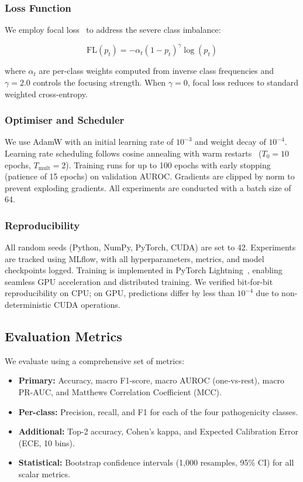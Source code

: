 \documentclass[journal,twoside]{IEEEtran}
\begin{document}
\subsubsection{Loss Function}
We employ focal loss~\cite{lin2017focal} to address the severe class
imbalance:

\begin{equation}
    \text{FL}(p_t) = -\alpha_t (1 - p_t)^\gamma \log(p_t)
\end{equation}

\noindent where $\alpha_t$ are per-class weights computed from inverse class
frequencies and $\gamma = 2.0$ controls the focusing strength. When
$\gamma = 0$, focal loss reduces to standard weighted cross-entropy.

\subsubsection{Optimiser and Scheduler}
We use AdamW with an initial learning rate of $10^{-3}$ and weight decay of
$10^{-4}$. Learning rate scheduling follows cosine annealing with warm
restarts~\cite{loshchilov2017sgdr} ($T_0 = 10$ epochs, $T_{\text{mult}} = 2$).
Training runs for up to 100 epochs with early stopping (patience of 15 epochs)
on validation AUROC. Gradients are clipped by norm to prevent exploding
gradients. All experiments are conducted with a batch size of 64.

\subsubsection{Reproducibility}
All random seeds (Python, NumPy, PyTorch, CUDA) are set to 42.
Experiments are tracked using MLflow, with all hyperparameters, metrics,
and model checkpoints logged. Training is implemented in PyTorch
Lightning~\cite{falcon2019pytorch}, enabling seamless GPU acceleration
and distributed training. We verified bit-for-bit reproducibility on
CPU; on GPU, predictions differ by less than $10^{-4}$ due to
non-deterministic CUDA operations.

\subsection{Evaluation Metrics}

We evaluate using a comprehensive set of metrics:
\begin{itemize}
    \item \textbf{Primary:} Accuracy, macro F1-score, macro AUROC (one-vs-rest),
    macro PR-AUC, and Matthews Correlation Coefficient (MCC).
    \item \textbf{Per-class:} Precision, recall, and F1 for each of the four
    pathogenicity classes.
    \item \textbf{Additional:} Top-2 accuracy, Cohen's kappa, and Expected
    Calibration Error (ECE, 10 bins).
    \item \textbf{Statistical:} Bootstrap confidence intervals (1,000
    resamples, 95\% CI) for all scalar metrics.
\end{itemize}
\end{document}
